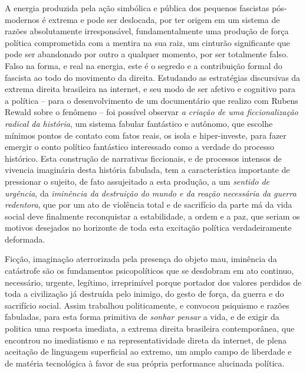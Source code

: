 A energia produzida pela ação simbólica e pública dos pequenos fascistas
pós-modernos é extrema e pode ser deslocada, por ter origem em um
sistema de razões absolutamente irresponsável, fundamentalmente uma
produção de força política comprometida com a mentira na sua raiz, um
cinturão significante que pode ser abandonado por outro a qualquer
momento, por ser totalmente falso. Falso na forma, e real na energia,
este é o segredo e a contribuição formal do fascista ao todo do
movimento da direita. Estudando as estratégias discursivas da extrema
direita brasileira na internet, e seu modo de ser afetivo e cognitivo
para a política -- para o desenvolvimento de um documentário que realizo
com Rubens Rewald sobre o fenômeno -- foi possível observar \emph{a
criação de uma ficcionalização radical da história}, um sistema fabular
fantástico e autônomo, que escolhe mínimos pontos de contato com fatos
reais, os isola e hiper-investe, para fazer emergir o conto político
fantástico interessado como a verdade do processo histórico. Esta
construção de narrativas ficcionais, e de processos intensos de vivencia
imaginária desta história fabulada, tem a característica importante de
pressionar o sujeito, de fato assujeitado a esta produção, a um
\emph{sentido de urgência}, da \emph{iminência da destruição do mundo e
da reação necessária da guerra redentora}, que por um ato de violência
total e de sacrifício da parte má da vida social deve finalmente
reconquistar a estabilidade, a ordem e a paz, que seriam os motivos
desejados no horizonte de toda esta excitação política verdadeiramente
deformada.

Ficção, imaginação aterrorizada pela presença do objeto mau, iminência
da catástrofe são os fundamentos psicopolíticos que se desdobram em ato
continuo, necessário, urgente, legítimo, irreprimível porque portador
dos valores perdidos de toda a civilização já destruída pelo inimigo, do
gesto de força, da guerra e do sacrifício social. Assim trabalhou
politicamente, e convocou psiquismo e razões fabuladas, para esta forma
primitiva de \emph{sonhar pensar} a vida, e de exigir da politica uma
resposta imediata, a extrema direita brasileira contemporânea, que
encontrou no imediatismo e na representatividade direta da internet, de
plena aceitação de linguagem superficial ao extremo, um amplo campo de
liberdade e de matéria tecnológica à favor de sua própria performance
alucinada política.

